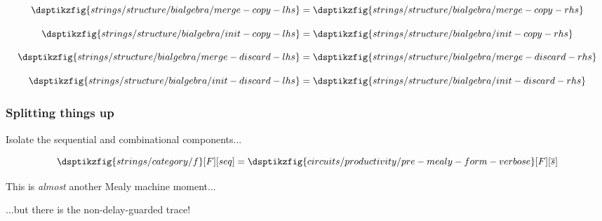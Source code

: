\begin{frame}
\begin{axiom}
        \begin{minipage}{0.28\textwidth}
            \begin{equation*}
                \dsptikzfig{strings/structure/bialgebra/merge-copy-lhs}
                =
                \dsptikzfig{strings/structure/bialgebra/merge-copy-rhs}
            \end{equation*}
        \end{minipage}
        \begin{minipage}{0.23\textwidth}
            \begin{equation*}
                \dsptikzfig{strings/structure/bialgebra/init-copy-lhs}
                =
                \dsptikzfig{strings/structure/bialgebra/init-copy-rhs}
            \end{equation*}
        \end{minipage}
        \begin{minipage}{0.23\textwidth}
            \begin{equation*}
                \dsptikzfig{strings/structure/bialgebra/merge-discard-lhs}
                =
                \dsptikzfig{strings/structure/bialgebra/merge-discard-rhs}
            \end{equation*}
        \end{minipage}
        \begin{minipage}{0.2\textwidth}
            \begin{equation*}
                \dsptikzfig{strings/structure/bialgebra/init-discard-lhs}
                =
                \dsptikzfig{strings/structure/bialgebra/init-discard-rhs}
            \end{equation*}
        \end{minipage}
    \end{axiom}
\end{frame}
\begin{frame}
    \frametitle{Splitting things up}

    \centering

    \alert{Isolate} the sequential and combinational components...

    \pause
    \[
        \dsptikzfig{strings/category/f}[F][seq]
        =
        \dsptikzfig{circuits/productivity/pre-mealy-form-verbose}[F][\overline{s}]
    \]

    \pause
    This is \emph{almost} another Mealy machine moment...

    \pause
    ...but there is the non-delay-guarded trace!
\end{frame}
